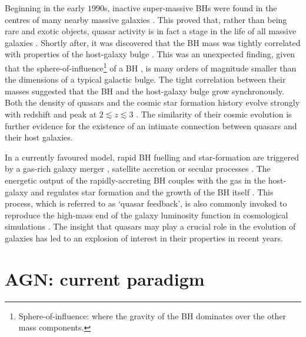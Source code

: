 Beginning in the early $1990$s, inactive super-massive BHs were found in the centres of many nearby massive galaxies \citep[e.g.][]{kormendy95,ferrarese05,kormendy13}.
This proved that, rather than being rare and exotic objects, quasar activity is in fact a stage in the life of all massive galaxies \citep[e.g.][]{lynden-bell69}. 
Shortly after, it was discovered that the BH mass was tightly correlated with properties of the host-galaxy bulge \citep[e.g. the stellar velocity dispersion, $\sigma$, which is proportional to the bulge mass; e.g.][]{ferrarese00,gebhardt00,graham01,tremaine02,marconi03,aller07,gultekin09}.
This was an unexpected finding, given that the sphere-of-influence\footnote{Sphere-of-influence: where the gravity of the BH dominates over the other mass components.} of a BH \citep[$\lesssim100$ parsecs; e.g.][]{kormendy13}, is many orders of magnitude smaller than the dimensions of a typical galactic bulge. 
The tight correlation between their masses suggested that the BH and the host-galaxy bulge grow synchronously.
Both the density of quasars and the cosmic star formation history evolve strongly with redshift and peak at $2 \lesssim z \lesssim 3$ \citep[e.g.][]{boyle98,brandt05,richards06b}. 
The similarity of their cosmic evolution is further evidence for the existence of an intimate connection between quasars and their host galaxies. 

In a currently favoured model, rapid BH fuelling and star-formation are triggered by a gas-rich galaxy merger \citep[e.g.][]{hopkins06a}, satellite accretion or secular processes \citep[e.g.][]{fanidakis12}. 
The energetic output of the rapidly-accreting BH couples with the gas in the host-galaxy and regulates star formation and the growth of the BH itself \citep[e.g.][]{silk98,king03,dimatteo05,king15}. 
This process, which is referred to as `quasar feedback', is also commonly invoked to reproduce the high-mass end of the galaxy luminosity function in cosmological simulations \citep[e.g.][]{kauffmann00}.  
The insight that quasars may play a crucial role in the evolution of galaxies has led to an explosion of interest in their properties in recent years. 

\section{AGN: current paradigm}

